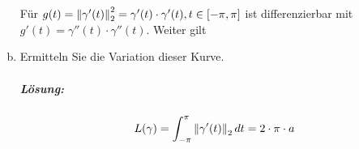 \documentclass{scrreprt}
\begin{document}
\begin{enumerate}[a)]
  Für $g(t) = \norm{\gamma'(t)}_2^2 = \gamma'(t) \cdot \gamma'(t), t \in [-\pi, \pi]$
  ist differenzierbar mit $g'(t) = \gamma''(t) \cdot \gamma''(t)$.
  Weiter gilt

\item Ermitteln Sie die Variation dieser Kurve.
  \subparagraph{Lösung:}
  \[
    L(\gamma) = \int_{-\pi}^{\pi} \norm{\gamma'(t)}_2\,dt = 2 \cdot \pi \cdot a
  \]


\end{enumerate}
\end{document}
